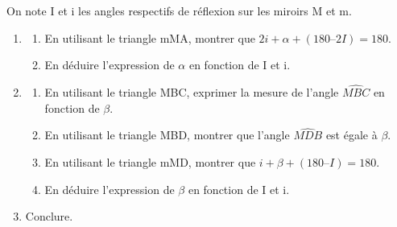 \begin{multicols}{2}
\begin{enumerate}
On note I et i les angles respectifs de réflexion sur les miroirs M et m.
\begin{enumerate}
\item \begin{enumerate}
	\item En utilisant le triangle mMA, montrer que $2i + \alpha + (180 – 2I) = 180$.
	\item En déduire l'expression de $\alpha$ en fonction de I et i.
	\end{enumerate}
\item \begin{enumerate}
	\item En utilisant le triangle MBC, exprimer la mesure de l'angle $\widehat{MBC}$ en fonction de $\beta$.
	\item En utilisant le triangle MBD, montrer que l'angle $\widehat{MDB}$ est égale à $\beta$.
	\item En utilisant le triangle mMD, montrer que $i + \beta + (180 – I) = 180$.
	\item En déduire l'expression de $\beta$ en fonction de I et i.
	\end{enumerate}
\item Conclure.


\end{enumerate}
\end{enumerate}
\end{multicols}
